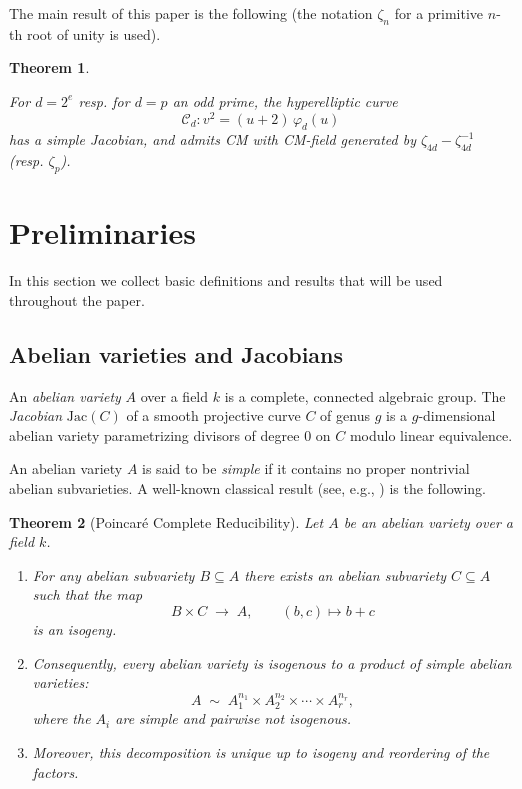 \documentclass[a4paper,12pt]{amsart}
\def\cC{{\mathcal C}}
\numberwithin{equation}{section}
\theoremstyle{plain}
\newtheorem{thm}{Theorem}
\numberwithin{thm}{section}
\begin{document}
The main result of this paper is the following (the notation
$\zeta_n$ for a primitive $n$-th root of unity is used).

\begin{thm}\label{mainthm}

For $d=2^e$ resp. for $d=p$ an odd prime, the hyperelliptic curve
\[
\cC_d\colon v^2 = (u+2)\,\varphi_d(u)
\]
has a simple Jacobian, and admits CM with CM-field  generated by $\zeta_{4d} - \zeta_{4d}^{-1}$ (resp. $\zeta_p$). 
\end{thm}

\section{Preliminaries}

In this section we collect basic definitions and results that will be used throughout the paper.  

\subsection{Abelian varieties and Jacobians}

An \emph{abelian variety} $A$ over a field $k$ is a complete, connected algebraic group. The \emph{Jacobian} $\textrm{Jac}(C)$ of a smooth projective curve $C$ of genus $g$ is a $g$-dimensional abelian variety parametrizing divisors of degree $0$ on $C$ modulo linear equivalence.

An abelian variety $A$ is said to be \emph{simple} if it contains no proper nontrivial abelian subvarieties. 
A well-known classical result (see, e.g., \cite[\S12]{CorSil})
is the following.

\begin{thm}[Poincar\'e Complete Reducibility]
Let $A$ be an abelian variety over a field $k$. 
\begin{enumerate}
    \item For any abelian subvariety $B \subseteq A$ there exists an abelian subvariety 
    $C \subseteq A$ such that the map
    \[
    B \times C \;\longrightarrow\; A, \qquad (b,c) \mapsto b+c
    \]
    is an isogeny.
    \item Consequently, every abelian variety is isogenous to a product of simple 
    abelian varieties:
    \[
    A \;\sim\; A_1^{n_1} \times A_2^{n_2} \times \cdots \times A_r^{n_r},
    \]
    where the $A_i$ are simple and pairwise not isogenous.
    \item Moreover, this decomposition is unique up to isogeny and reordering 
    of the factors.
\end{enumerate}
\end{thm}
\end{document}
